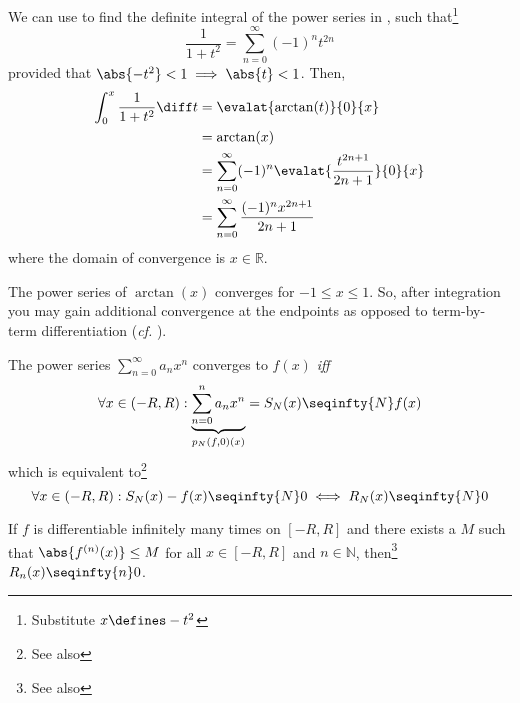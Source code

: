 \begin{exm}\label{exm-term-by-term-integration:1}
	We can use  to find the definite
	integral of the power series in ,
	such that\footnote{Substitute $x\defines-t^2$}
	\begin{equation*}
		\frac{1}{1+t^2} = \sum_{n=0}^\infty (-1)^n t^{2n}
	\end{equation*}
	provided that $\abs{-t^2}<1\implies\abs{t}<1$. Then,
	\begin{align*}
		\int_0^x  \frac{1}{1+t^2} \diff t
		 & = \evalat{\arctan(t)}{0}{x}                                     \\
		 & = \arctan(x)                                                    \\
		 & = \sum_{n=0}^\infty (-1)^n \evalat{\frac{t^{2n+1}}{2n+1}}{0}{x} \\
		 & = \sum_{n=0}^\infty \frac{(-1)^n x^{2n+1}}{2n+1}
	\end{align*}
	where the domain of convergence is $x\in\mathbb{R}$.
\end{exm}

\begin{rem}\label{rem-term-by-term-integration}
	The power series of $\arctan(x)$ converges for $-1 \leq x \leq 1$. So, after
	integration you may gain additional convergence at the endpoints as opposed
	to term-by-term differentiation (\textit{cf.} ).
\end{rem}

\begin{rem}\label{rem-power-series-taylor-convergence}
	The power series $\sum_{n=0}^\infty a_n x^n$ converges to $f(x)$ \textit{iff}
	\begin{equation*}
		\forall x\in(-R,R): \underbrace{\sum_{n=0}^n a_n x^n}_{p_N(f,0)(x)} = S_N(x) \seqinfty{N} f(x)
	\end{equation*}
	which is equivalent to\footnote{See also }
	\begin{equation*}
		\forall x\in(-R,R): S_N(x)-f(x) \seqinfty{N} 0 \iff R_N(x) \seqinfty{N} 0
	\end{equation*}
\end{rem}

\begin{thm}\label{thm-power-series-taylor-convergence}
	If $f$ is differentiable infinitely many times on $[-R,R]$ and there exists a
	$M$ such that $\abs{f^{(n)}(x)} \leq M$ for all $x\in[-R,R]$ and $n\in\mathbb{N}$,
	then\footnote{See also }
	$R_n(x) \seqinfty{n} 0$.
\end{thm}

